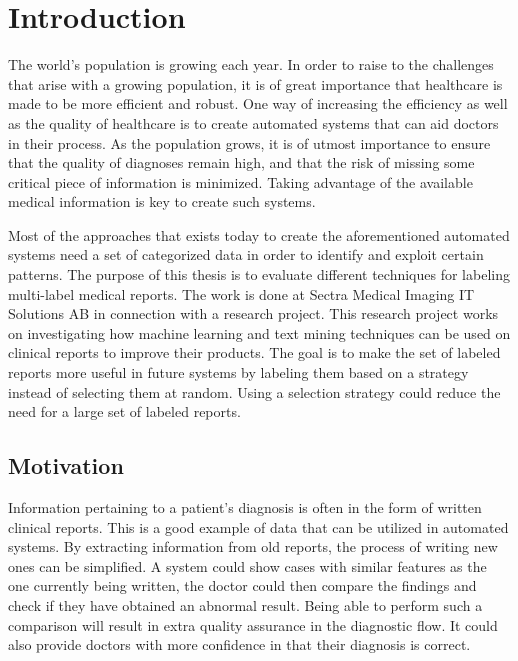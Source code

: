 \chapter{Introduction}
\label{cha:introduction}

The world's population is growing each year. 
In order to raise to the challenges that arise with a growing population, it is of great importance that healthcare is made to be more efficient and robust.
One way of increasing the efficiency as well as the quality of healthcare is to create automated systems that can aid doctors in their process.
As the population grows, it is of utmost importance to ensure that the quality of diagnoses remain high, and that the risk of missing some critical piece of information is minimized.
Taking advantage of the available medical information is key to create such systems.

Most of the approaches that exists today to create the aforementioned automated systems need a set of categorized data in order to identify and exploit certain patterns.
The purpose of this thesis is to evaluate different techniques for labeling multi-label medical reports.
The work is done at Sectra Medical Imaging IT Solutions AB in connection with a research project.
This research project works on investigating how machine learning and text mining techniques can be used on clinical reports to improve their products.
The goal is to make the set of labeled reports more useful in future systems by labeling them based on a strategy instead of selecting them at random.
Using a selection strategy could reduce the need for a large set of labeled reports.

\section{Motivation}
\label{sec:motivation}

Information pertaining to a patient's diagnosis is often in the form of written clinical reports.
This is a good example of data that can be utilized in automated systems.
By extracting information from old reports, the process of writing new ones can be simplified.
A system could show cases with similar features as the one currently being written, the doctor could then compare the findings and check if they have obtained an abnormal result.
Being able to perform such a comparison will result in extra quality assurance in the diagnostic flow.
It could also provide doctors with more confidence in that their diagnosis is correct.

